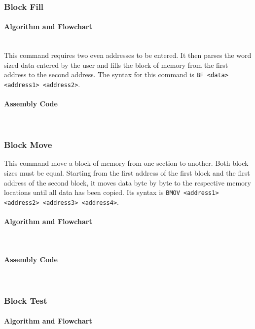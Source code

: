 \documentclass[12pt]{article}
\begin{document}
			\subsubsection{Block Fill}
			\paragraph{Algorithm and Flowchart}~\\
			This command requires two even addresses to be entered. It then parses the word sized data entered by the user and fills the block of memory from the first address to the second address. The syntax for this command is \texttt{BF <data> <address1> <address2>}.
			\paragraph{Assembly Code}~\\
			
			
			\subsubsection{Block Move}
			This command move a block of memory from one section to another. Both block sizes must be equal. Starting from the first address of the first block and the first address of the second block, it moves data byte by byte to the respective memory locations until all data has been copied. Its syntax is \texttt{BMOV <address1> <address2> <address3> <address4>}.
			\paragraph{Algorithm and Flowchart}~\\
			\paragraph{Assembly Code}~\\				
			
			\subsubsection{Block Test}
			\paragraph{Algorithm and Flowchart}~\\
			
\end{document}
